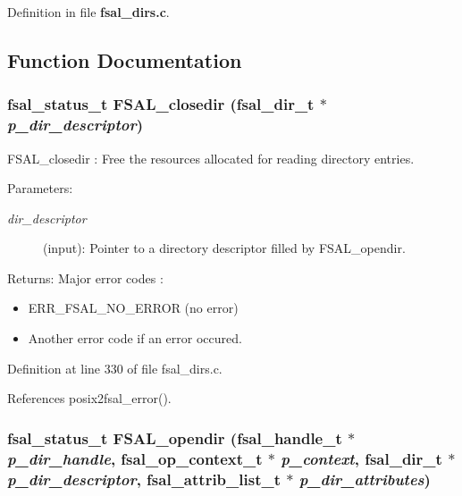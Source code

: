 Definition in file {\bf fsal\_\-dirs.c}.

\subsection{Function Documentation}
\subsubsection{\setlength{\rightskip}{0pt plus 5cm}fsal\_\-status\_\-t FSAL\_\-closedir (fsal\_\-dir\_\-t $\ast$ {\em p\_\-dir\_\-descriptor})}\label{fsal__dirs_8c_a2}


FSAL\_\-closedir : Free the resources allocated for reading directory entries.

\begin{Desc}
\item[Parameters:]
\begin{description}
\item[{\em dir\_\-descriptor}](input): Pointer to a directory descriptor filled by FSAL\_\-opendir.\end{description}
\end{Desc}
\begin{Desc}
\item[Returns:]Major error codes :\begin{itemize}
\item ERR\_\-FSAL\_\-NO\_\-ERROR (no error)\item Another error code if an error occured. \end{itemize}
\end{Desc}


Definition at line 330 of file fsal\_\-dirs.c.

References posix2fsal\_\-error().
\subsubsection{\setlength{\rightskip}{0pt plus 5cm}fsal\_\-status\_\-t FSAL\_\-opendir (fsal\_\-handle\_\-t $\ast$ {\em p\_\-dir\_\-handle}, fsal\_\-op\_\-context\_\-t $\ast$ {\em p\_\-context}, fsal\_\-dir\_\-t $\ast$ {\em p\_\-dir\_\-descriptor}, fsal\_\-attrib\_\-list\_\-t $\ast$ {\em p\_\-dir\_\-attributes})}\label{fsal__dirs_8c_a0}



